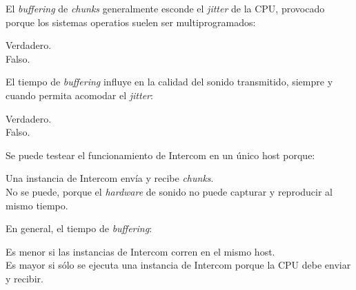 \documentclass[legalpaper, 12pt, addpoints]{exam}
\begin{document}
\begin{questions}
\vspace{0.10in}

\question El \emph{buffering} de \emph{chunks} generalmente esconde el
\emph{jitter} de la CPU, provocado porque los sistemas operatios
suelen ser multiprogramados:

\begin{oneparchoices}
  \choice Verdadero.\\
  \choice Falso.
\end{oneparchoices}
  
\vspace{0.10in}

\question El tiempo de \emph{buffering} influye en la calidad del
sonido transmitido, siempre y cuando permita acomodar el
\emph{jitter}:

\begin{oneparchoices}
  \choice Verdadero.\\
  \choice Falso.
\end{oneparchoices}
  
\vspace{0.10in}

\question Se puede testear el funcionamiento de Intercom en un único host porque:

\begin{oneparchoices}
  \choice Una instancia de Intercom envía y recibe \emph{chunks}.\\
  \choice No se puede, porque el \emph{hardware} de sonido no puede capturar y reproducir al mismo tiempo.
\end{oneparchoices}
  
\vspace{0.10in}

\question En general, el tiempo de \emph{buffering}:

\begin{oneparchoices}
  \choice Es menor si las instancias de Intercom corren en el mismo host.\\
  \choice Es mayor si sólo se ejecuta una instancia de Intercom porque la CPU debe enviar y recibir.
\end{oneparchoices}
  
\vspace{0.10in}


  

\end{questions}
\end{document}
